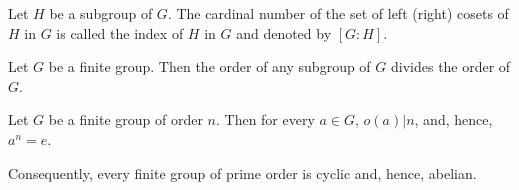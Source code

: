\begin{defi}
    Let $H$ be a subgroup of $G$. The cardinal number of the set of left (right) cosets of $H$ in $G$ is called the index of $H$ in $G$ and denoted by $[G:H]$.
\end{defi}
\begin{teo}
Let $G$ be a finite group. Then the order of any subgroup of $G$ divides the order of $G$.
\end{teo}
\begin{coro}
    Let $G$ be a finite group of order $n$. Then for every $a\in G$, $o(a)|n$, and, hence, $a^n=e$.

    Consequently, every finite group of prime order is cyclic and, hence, abelian.
\end{coro}